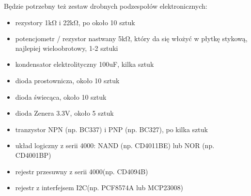 \documentclass{pdfBooklets}
\begin{document}
Będzie potrzebny też zestaw drobnych podzespołów elektronicznych:
\begin{itemize}
	\item rezystory 1kΩ i 22kΩ, po około 10 sztuk
	\item potencjometr / rezystor nastwany 5kΩ, który da się włożyć w płytkę stykową, najlepiej wieloobrotowy, 1-2 sztuki
	\item kondensator elektrolityczny 100uF, kilka sztuk
	
	\item dioda prostownicza, około 10 sztuk
	\item dioda świecąca, około 10 sztuk
	\item dioda Zenera 3.3V, około 5 sztuk
	\item tranzystor NPN (np. BC337) i PNP (np. BC327), po kilka sztuk
	
	\item układ logiczny z serii 4000\footnotemark[2]: NAND (np. CD4011BE) lub NOR (np. CD4001BP)
	\item rejestr przesuwny z serii 4000\footnotemark[2] (np. CD4094B)
	\item rejestr z interfejsem I2C\footnotemark[3] (np. PCF8574A lub MCP23008)
\end{itemize}




\end{document}

